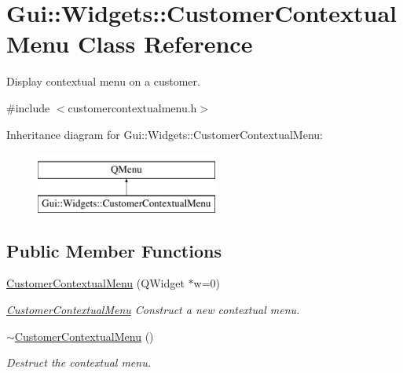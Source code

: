 \hypertarget{classGui_1_1Widgets_1_1CustomerContextualMenu}{\section{Gui\-:\-:Widgets\-:\-:Customer\-Contextual\-Menu Class Reference}
\label{classGui_1_1Widgets_1_1CustomerContextualMenu}
}


Display contextual menu on a customer.  




{\ttfamily \#include $<$customercontextualmenu.\-h$>$}

Inheritance diagram for Gui\-:\-:Widgets\-:\-:Customer\-Contextual\-Menu\-:\begin{figure}[H]
\begin{center}
\leavevmode
\includegraphics[height=2.000000cm]{d8/ded/classGui_1_1Widgets_1_1CustomerContextualMenu}
\end{center}
\end{figure}
\subsection*{Public Member Functions}
\begin{DoxyCompactItemize}
\item 
\hyperlink{classGui_1_1Widgets_1_1CustomerContextualMenu_ab8fc199bd6adf21f7dd5e881e0a73b16}{Customer\-Contextual\-Menu} (Q\-Widget $\ast$w=0)
\begin{DoxyCompactList}\small\item\em \hyperlink{classGui_1_1Widgets_1_1CustomerContextualMenu}{Customer\-Contextual\-Menu} Construct a new contextual menu. \end{DoxyCompactList}\item 
\hypertarget{classGui_1_1Widgets_1_1CustomerContextualMenu_a6814dcf744752f9026c85a9640cf23ef}{\hyperlink{classGui_1_1Widgets_1_1CustomerContextualMenu_a6814dcf744752f9026c85a9640cf23ef}{$\sim$\-Customer\-Contextual\-Menu} ()}\label{classGui_1_1Widgets_1_1CustomerContextualMenu_a6814dcf744752f9026c85a9640cf23ef}

\begin{DoxyCompactList}\small\item\em Destruct the contextual menu. \end{DoxyCompactList}\end{DoxyCompactItemize}


